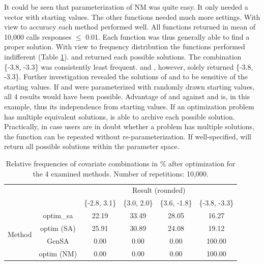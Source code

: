 It could be seen that parameterization of NM was quite easy. It only needed a vector with starting values. The other functions needed much more settings. With view to accuracy each method performed well. All functions returned in mean of 10,000 calls responses $\leq$ 0.01. Each function was thus generally able to find a proper solution. With view to frequency distribution the functions performed indifferent (Table \ref{tab:tab1}).  and  returned each possible solutions.  The combination \{-3.8, -3.3\} was consistently least frequent.  and , however, solely returned \{-3.8, -3.3\}. Further investigation revealed the solutions of  and  to be sensitive of the starting values. If  and  were parameterized with randomly drawn starting values, all 4 results would have been possible. Advantage of  and  against  and  is, in this example, thus its independence from starting values. If an optimization problem has multiple equivalent solutions,  is able to archive each possible solution. Practically, in case users are in doubt whether a problem has multiple solutions, the function can be repeated without re-parameterization. If well-specified,  will return all possible solutions within the parameter space.

\begin{table}[]
	\centering
	\caption{Relative frequencies of covariate combinations in \% after optimization for the 4 examined methods. Number of repetitions: 10,000.}
	\label{tab:tab1}
	\begin{tabular}{cccccc}
		\cline{3-6}
		& \multicolumn{1}{c}{} & \multicolumn{4}{c}{Result (rounded)}                    \\ \cline{3-6} 
		&                      & \{-2.8, 3.1\} & \{3.0, 2.0\} & \{3.6, -1.8\} & \{-3.8, -3.3\} \\ \cline{2-6} 
		\multirow{4}{*}{Method} & optim\_sa          & 22.19     & 33.49    & 28.05     & 16.27      \\
		& optim (SA)            & 25.91     & 30.89    & 24.08     & 19.12      \\
		& GenSA              & 0.00      & 0.00     & 0.00      & 100.00     \\
		& optim (NM)          & 0.00      & 0.00     & 0.00      & 100.00     \\ \cline{2-6} 
	\end{tabular}
\end{table}

